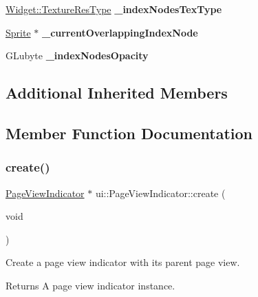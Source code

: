 \begin{DoxyCompactItemize}
\hyperlink{classui_1_1Widget_a040a65ec5ad3b11119b7e16b98bd9af0}{Widget\+::\+Texture\+Res\+Type} {\bfseries \+\_\+index\+Nodes\+Tex\+Type}
\item 
\mbox{\label{classui_1_1PageViewIndicator_a66d7bd03b3be8267763da2b07db5eb95}} 
\hyperlink{classSprite}{Sprite} $\ast$ {\bfseries \+\_\+current\+Overlapping\+Index\+Node}
\item 
\mbox{\label{classui_1_1PageViewIndicator_a82fd5f9dddc8fdc3a5583a29defb6ecf}} 
G\+Lubyte {\bfseries \+\_\+index\+Nodes\+Opacity}
\end{DoxyCompactItemize}
\subsection*{Additional Inherited Members}


\subsection{Member Function Documentation}
\mbox{\label{classui_1_1PageViewIndicator_a7a9abf8796b02efe36810e70e19591d6}} 
\subsubsection{\texorpdfstring{create()}{create()}\hspace{0.1cm}{\footnotesize\ttfamily [1/2]}}
{\footnotesize\ttfamily \hyperlink{classui_1_1PageViewIndicator}{Page\+View\+Indicator} $\ast$ ui\+::\+Page\+View\+Indicator\+::create (\begin{DoxyParamCaption}\item[{void}]{ }\end{DoxyParamCaption})\hspace{0.3cm}{\ttfamily [static]}}

Create a page view indicator with its parent page view. \begin{DoxyReturn}{Returns}
A page view indicator instance. 
\end{DoxyReturn}
\mbox{\label{classui_1_1PageViewIndicator_ae9227f8bd42b0a26c9dc9abfcf71aa07}} 
